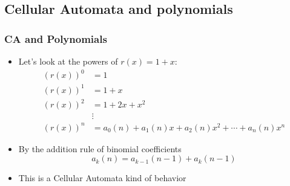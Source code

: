 \documentclass{beamer}
\begin{document}
\subsection{Cellular Automata and polynomials}
\begin{frame}
    \frametitle{CA and Polynomials}
    \begin{itemize}
        \item Let's look at the powers of $r(x) = 1 + x$:
        \begin{align*}
            (r(x))^{0} &=1 \\
            (r(x))^{1} &=1+x \\
            (r(x))^{2} &=1+2 x+x^{2} \\
            & \vdots \\
            (r(x))^{n} &=a_{0}(n)+a_{1}(n) x+a_{2}(n) x^{2}+\cdots+a_{n}(n) x^{n} 
        \end{align*}
        \item By the addition rule of binomial coefficients
        \begin{equation*}
            a_k(n) = a_{k-1}(n-1) + a_k(n-1)
        \end{equation*}
        \item This is a Cellular Automata kind of behavior
    \end{itemize}
\end{frame}
\end{document}
